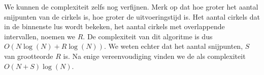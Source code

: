 We kunnen de complexiteit zelfs nog verfijnen. Merk op dat hoe groter het aantal snijpunten van de cirkels is, hoe groter de uitvoeringstijd is. Het aantal cirkels dat in de binnenste lus wordt bekeken, het aantal cirkels met overlappende intervallen, noemen we $R$. De complexiteit van dit algoritme is dus $O(N\log(N) + R\log(N))$. We weten echter dat het aantal snijpunten, $S$ van grootteorde $R$ is. Na enige vereenvoudiging vinden we de als complexiteit $O(N+S)\log(N)$.


